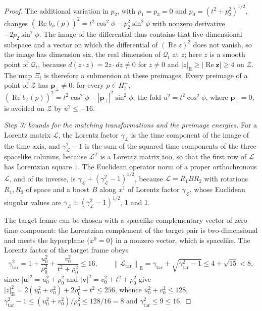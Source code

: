 \documentclass[11pt]{amsart}
\numberwithin{equation}{section}
\theoremstyle{definition}
\newcommand{\bp}{\mathbf p}
\newcommand{\bz}{\mathbf z}
\newcommand{\Rea}{\operatorname{Re}}
\newcommand{\norm}[1]{\left\|#1\right\|}
\begin{document}
\begin{proof}
The additional variation in \(p_2\), with \(p_1=p_3=0\) and
\(p_0=(t^2+p_2^2)^{1/2}\), changes
\((\Rea b_\phi(p))^2=t^2\cos^2\phi-p_2^2\sin^2\phi\) with nonzero derivative
\(-2p_2\sin^2\phi\). The image of the differential thus contains that
five-dimensional subspace and a vector on which the differential of
\((\Rea z)^2\) does not vanish, so the image has dimension six, the real dimension
of \(\mathcal Q_t\) at \(z\); here \(z\) is a smooth point of
\(\mathcal Q_t\), because \(d(z\cdot z)=2z\cdot dz\ne0\) for \(z\ne0\) and
\(|z|_{\mathrm E}\ge\lvert\Rea\bz\rvert\ge4\) on \(\mathscr Z\). The map \(\Xi_t\) is
therefore a submersion at these preimages. Every preimage of a point of
\(\mathscr Z\) has \(\bp_\perp\ne0\): for every \(p\in H_t^+\),
\((\Rea b_\phi(p))^2=t^2\cos^2\phi-|\bp_\perp|^2\sin^2\phi\); the fold
\(u^2=t^2\cos^2\phi\), where \(\bp_\perp=0\), is avoided on \(\mathscr Z\) by
\(u^2\le-16\).

\smallskip
\emph{Step 3: bounds for the matching transformations and the preimage
energies.} For a Lorentz matrix \(\mathcal L\), the Lorentz
factor \(\gamma_{\mathcal L}\) is the time component of the image of the
time axis, and \(\gamma_{\mathcal L}^2-1\) is the sum of the squared time
components of the three spacelike columns, because \(\mathcal L^T\) is a
Lorentz matrix too, so that the first row of \(\mathcal L\) has Lorentzian
square \(1\). The Euclidean operator norm
of a proper orthochronous \(\mathcal L\), and of its inverse, is
\(\gamma_{\mathcal L}+(\gamma_{\mathcal L}^2-1)^{1/2}\), because
\(\mathcal L=R_1BR_2\) with rotations \(R_1,R_2\) of space and a boost \(B\)
along \(x^1\) of Lorentz factor \(\gamma_{\mathcal L}\), whose Euclidean
singular values are \(\gamma_{\mathcal L}\pm(\gamma_{\mathcal L}^2-1)^{1/2}\),
\(1\) and \(1\).

The target frame can be chosen with a
spacelike complementary vector of zero time component: the Lorentzian
complement of the target pair is two-dimensional and meets the hyperplane
\(\{x^0=0\}\) in a nonzero vector, which is spacelike. The Lorentz
factor of the target frame obeys
\[
 \gamma_{\mathrm{tar}}^2
 =1+\frac{u_0^2}{\rho_0^2}
    +\frac{v_0^2}{t^2+\rho_0^2}\le16,
 \qquad
 \norm{\mathcal L_{\mathrm{tar}}}_{\mathrm E}
 =\gamma_{\mathrm{tar}}
   +\sqrt{\gamma_{\mathrm{tar}}^2-1}
 \le4+\sqrt{15}<8,
\]
since \(|\mathbf u|^2=u_0^2+\rho_0^2\) and
\(|\mathbf v|^2=v_0^2+t^2+\rho_0^2\) give
\(|z|_{\mathrm E}^2=2(u_0^2+v_0^2)+2\rho_0^2+t^2\le256\), whence
\(u_0^2+v_0^2\le128\),
\(\gamma_{\mathrm{tar}}^2-1\le(u_0^2+v_0^2)/\rho_0^2\le128/16=8\) and
\(\gamma_{\mathrm{tar}}^2\le9\le16\).


\end{proof}
\end{document}
